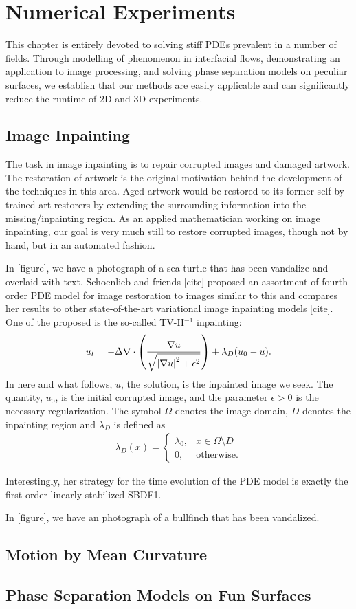 \chapter{Numerical Experiments}
This chapter is entirely devoted to solving stiff PDEs prevalent in a number of fields. Through modelling of phenomenon in interfacial flows, demonstrating an application to image processing, and solving phase separation models on peculiar surfaces, we establish that our methods are easily applicable and can significantly reduce the runtime of 2D and 3D experiments.

\section{Image Inpainting}
The task in image inpainting is to repair corrupted images and damaged artwork. The restoration of artwork is the original motivation behind the development of the techniques in this area. Aged artwork would be restored to its former self by trained art restorers by extending the surrounding information into the missing/inpainting region. As an applied mathematician working on image inpainting, our goal is very much still to restore corrupted images, though not by hand, but in an automated fashion.

In [figure], we have a photograph of a sea turtle that has been vandalize and overlaid with text. Schoenlieb and friends [cite] proposed an assortment of fourth order PDE model for image restoration to images similar to this and compares her results to other state-of-the-art variational image inpainting models [cite]. One of the proposed is the so-called TV-H$^{-1}$ inpainting: 
\begin{align}
u_t = -\Delta \nabla \cdot \left(\frac{\nabla u}{\sqrt{\left|\nabla u\right|^2 + \epsilon^2}}\right)
+ \lambda_D(u_0 - u).
\end{align}
In here and what follows, $u$, the solution, is the inpainted image we seek. The quantity, $u_0$, is the initial corrupted image, and the parameter $\epsilon > 0$ is the necessary regularization. The symbol $\Omega$ denotes the image domain, $D$ denotes the inpainting region and $\lambda_D$ is defined as 
\begin{align}
\lambda_D(x)
= \begin{cases}
\lambda_0, & x\in \Omega\setminus D
\\
0, &\text{otherwise}.
\end{cases}
\end{align}


Interestingly, her strategy for the time evolution of the PDE model is exactly the first order linearly stabilized SBDF1. 




In [figure], we have an photograph of a bullfinch that has been vandalized.


\section{Motion by Mean Curvature}



\section{Phase Separation Models on Fun Surfaces}